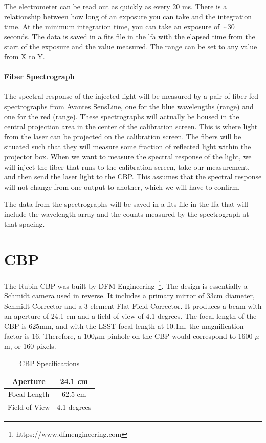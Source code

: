 \documentclass[SE,authoryear,lsstdraft,toc]{lsstdoc}
\begin{document}
The electrometer can be read out as quickly as every 20 ms. There is a relationship between how long of an exposure you can take and the integration time. At the minimum integration time, you can take an exposure of $\sim$30 seconds. The data is saved in a fits file in the lfa with the elapsed time from the start of the exposure and the value measured. The range can be set to any value from X to Y. 

\paragraph{\textbf{Fiber Spectrograph}}

The spectral response of the injected light will be measured by a pair of fiber-fed spectrographs from Avantes SensLine, one for the blue wavelengths (range) and one for the red (range). These spectrographs will actually be housed in the central projection area in the center of the calibration screen. This is where light from the laser can be projected on the calibration screen. The fibers will be situated such that they will measure some fraction of reflected light within the projector box. When we want to measure the spectral response of the light, we will inject the fiber that runs to the calibration screen, take our measurement, and then send the laser light to the CBP. This assumes that the spectral response will not change from one output to another, which we will have to confirm.

The data from the spectrographs will be saved in a fits file in the lfa that will include the wavelength array and the counts measured by the spectrograph at that spacing.

\section{CBP}
The Rubin CBP was built by DFM Engineering~\footnote{https://www.dfmengineering.com}.
The design is essentially a Schmidt camera used in reverse. 
It includes a primary mirror of 33cm diameter, Schmidt Corrector and a 3-element Flat Field Corrector. 
It produces a beam with an aperture of 24.1 cm and a field of view of 4.1 degrees. 
The focal length of the CBP is 625mm, and with the LSST focal length at 10.1m, the magnification factor is 16. Therefore, a 100$\mu$m pinhole on the CBP would correspond to 1600 $\mu$m, or 160 pixels. 

\begin{table}[h!]
    \centering
    \begin{tabular}{|c|c|}
      \hline
       Aperture   & 24.1 cm \\
      \hline
      Focal Length   & 62.5 cm \\
      \hline
      Field of View & 4.1 degrees \\
      \hline
    \end{tabular}
    \caption{CBP Specifications}
    \label{tab:my_label}
\end{table}
\end{document}
